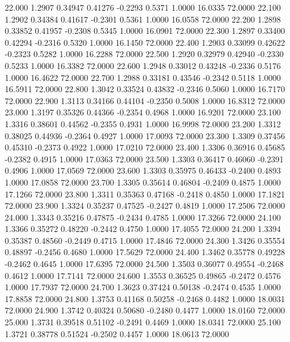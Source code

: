   22.000   1.2907   0.34947   0.41276  -0.2293   0.5371   1.0000  16.0335  72.0000
  22.100   1.2902   0.34384   0.41617  -0.2301   0.5361   1.0000  16.0558  72.0000
  22.200   1.2898   0.33852   0.41957  -0.2308   0.5345   1.0000  16.0901  72.0000
  22.300   1.2897   0.33400   0.42294  -0.2316   0.5320   1.0000  16.1450  72.0000
  22.400   1.2903   0.33099   0.42622  -0.2323   0.5282   1.0000  16.2288  72.0000
  22.500   1.2920   0.32979   0.42940  -0.2330   0.5233   1.0000  16.3382  72.0000
  22.600   1.2948   0.33012   0.43248  -0.2336   0.5176   1.0000  16.4622  72.0000
  22.700   1.2988   0.33181   0.43546  -0.2342   0.5118   1.0000  16.5911  72.0000
  22.800   1.3042   0.33524   0.43832  -0.2346   0.5060   1.0000  16.7170  72.0000
  22.900   1.3113   0.34166   0.44104  -0.2350   0.5008   1.0000  16.8312  72.0000
  23.000   1.3197   0.35326   0.44366  -0.2354   0.4968   1.0000  16.9201  72.0000
  23.100   1.3316   0.38601   0.44562  -0.2355   0.4931   1.0000  16.9998  72.0000
  23.200   1.3312   0.38025   0.44936  -0.2364   0.4927   1.0000  17.0093  72.0000
  23.300   1.3309   0.37456   0.45310  -0.2373   0.4922   1.0000  17.0210  72.0000
  23.400   1.3306   0.36916   0.45685  -0.2382   0.4915   1.0000  17.0363  72.0000
  23.500   1.3303   0.36417   0.46060  -0.2391   0.4906   1.0000  17.0569  72.0000
  23.600   1.3303   0.35975   0.46433  -0.2400   0.4893   1.0000  17.0858  72.0000
  23.700   1.3305   0.35614   0.46804  -0.2409   0.4875   1.0000  17.1266  72.0000
  23.800   1.3311   0.35363   0.47168  -0.2418   0.4850   1.0000  17.1821  72.0000
  23.900   1.3324   0.35237   0.47525  -0.2427   0.4819   1.0000  17.2506  72.0000
  24.000   1.3343   0.35216   0.47875  -0.2434   0.4785   1.0000  17.3266  72.0000
  24.100   1.3366   0.35272   0.48220  -0.2442   0.4750   1.0000  17.4055  72.0000
  24.200   1.3394   0.35387   0.48560  -0.2449   0.4715   1.0000  17.4846  72.0000
  24.300   1.3426   0.35554   0.48897  -0.2456   0.4680   1.0000  17.5629  72.0000
  24.400   1.3462   0.35778   0.49228  -0.2462   0.4645   1.0000  17.6395  72.0000
  24.500   1.3503   0.36077   0.49554  -0.2468   0.4612   1.0000  17.7141  72.0000
  24.600   1.3553   0.36525   0.49865  -0.2472   0.4576   1.0000  17.7937  72.0000
  24.700   1.3623   0.37424   0.50138  -0.2474   0.4535   1.0000  17.8858  72.0000
  24.800   1.3753   0.41168   0.50258  -0.2468   0.4482   1.0000  18.0031  72.0000
  24.900   1.3742   0.40324   0.50680  -0.2480   0.4477   1.0000  18.0160  72.0000
  25.000   1.3731   0.39518   0.51102  -0.2491   0.4469   1.0000  18.0341  72.0000
  25.100   1.3721   0.38778   0.51524  -0.2502   0.4457   1.0000  18.0613  72.0000
